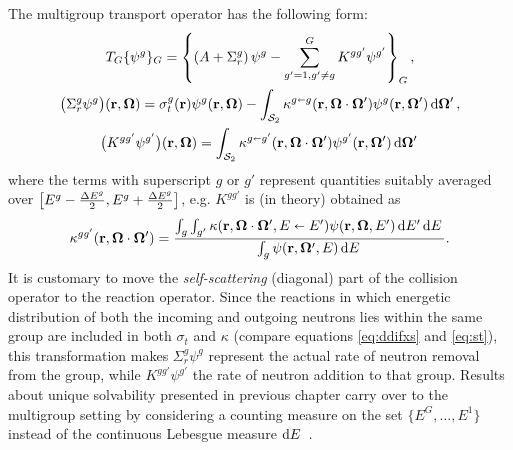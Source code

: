 The multigroup transport operator has the following form:
\begin{equation*}
\begin{gathered}
    T_G\{\psi^g\}_G = \left\{\left(A + \Sigma_r^g\right)\psi^g - \summ{g'=1,g'\neq g}{G}
    K^{gg'}\psi^{g'}\right\}_G,\\
    \bigl(\Sigma_r^g\psi^g\bigr)(\br,\bomega) = \sigma_t^g(\br)\psi^g(\br,\bomega) - \intA[']{\kappa^{g\sla
    g}(\br,\bomega\cdot\bomega')\psi^g(\br,\bomega')},\\ \bigl(K^{gg'}\psi^{g'}\bigr)(\br,\bomega) =
    \intA[']{\kappa^{g\sla g'}(\br,\bomega\cdot\bomega')\psi^{g'}(\br,\bomega')}
\end{gathered}
\end{equation*}
where the terms with superscript $g$ or $g'$ represent quantities suitably averaged over 
\mbox{$\bigl[E^{g}-\dEh{g}, E^{g}+\dEh{g}\bigr]$}, e.g. $K^{gg'}$ is (in theory) obtained as
\begin{equation}\label{eq:mg-kappa}
	\kappa^{gg'}(\br,\bomega\cdot\bomega') = \frac{\int_{g}\int_{g'} \kappa(\br,\bomega\cdot\bomega',E \sla
	E')\psi(\br,\bomega,E')\,\d{E'}\d{E}}{\int_{g}\psi(\br, \bomega', E)\,\d{E}}.
\end{equation}
It is customary to move the \textit{self-scattering} (diagonal) part of the
collision operator to the reaction operator. Since the reactions in which energetic distribution of both the incoming 
and outgoing neutrons lies within the same group are included in both $\sigma_t$ and $\kappa$  (compare equations
\eqref{eq:ddifxs} and \eqref{eq:st}), this transformation makes $\Sigma_r^g\psi^g$ represent the actual rate of neutron
removal from the group, while $K^{gg'}\psi^{g'}$ the rate of neutron addition to that group. Results about unique
solvability presented in previous chapter carry over to the multigroup setting by considering a counting measure on the
set $\{E^G,\ldots,E^1\}$ instead of the continuous Lebesgue measure $\d{E}$ \cite[Chap. XXI \S 2]{DautrayLions}.

